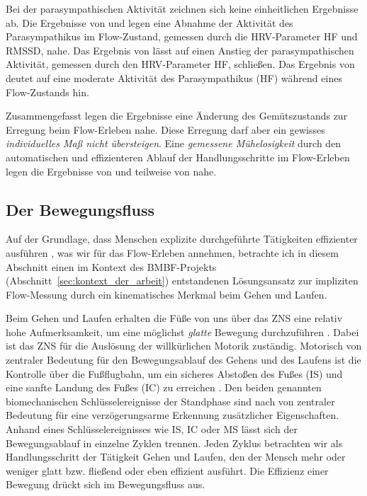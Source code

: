 Bei der parasympathischen Aktivität zeichnen sich keine einheitlichen Ergebnisse ab. Die Ergebnisse von \citet{deManzano2010} und \citet{Keller2011} legen eine Abnahme der Aktivität des Parasympathikus im Flow-Zustand, gemessen durch die \ac{HRV}-Parameter \acs{HF} und \acs{RMSSD}, nahe. Das Ergebnis von \citet{Peifer2014} lässt auf einen Anstieg der parasympathischen Aktivität, gemessen durch den \ac{HRV}-Parameter \acs{HF}, schließen. Das Ergebnis von \citet{Tozman2015} deutet auf eine moderate Aktivität des Parasympathikus (\acs{HF}) während eines Flow-Zustands hin.

Zusammengefasst legen die Ergebnisse eine Änderung des Gemütszustands zur Erregung beim Flow-Erleben nahe. Diese Erregung darf aber ein gewisses \emph{individuelles Maß nicht übersteigen}. Eine \emph{gemessene Mühelosigkeit} durch den automatischen und effizienteren Ablauf der Handlungsschritte im Flow-Erleben legen die Ergebnisse von \citet{Peifer2014} und teilweise von \citet{Tozman2015, Harmat2015} nahe.

\subsection{Der Bewegungsfluss} 

\label{ssub:der_bewegungsfluss}

Auf der Grundlage, dass Menschen explizite durchgeführte Tätigkeiten effizienter ausführen \citep[][S.~753]{Dietrich2004}, was wir für das Flow-Erleben annehmen, betrachte ich in diesem Abschnitt einen im Kontext des \acs{BMBF}-Projekts (Abschnitt~\ref{sec:kontext_der_arbeit}) entstandenen Lösungsansatz zur impliziten Flow-Messung durch ein kinematisches Merkmal beim Gehen und Laufen.

Beim Gehen und Laufen erhalten die Füße von uns über das \acs{ZNS} eine relativ hohe Aufmerksamkeit, um eine möglichst \emph{glatte} Bewegung durchzuführen \citep[][S.~193]{Brooks1986}. Dabei ist das \acs{ZNS} für die Auslösung der willkürlichen Motorik zuständig. Motorisch von zentraler Bedeutung für den Bewegungsablauf des Gehens und des Laufens ist die Kontrolle über die Fußflugbahn, um ein sicheres Abstoßen des Fußes (\ac{IS}) und eine sanfte Landung des Fußes (\ac{IC}) zu erreichen \citep[][S.~197]{Winter1989}. Den beiden genannten biomechanischen Schlüsselereignisse der Standphase sind nach \citet{Aminian2002, Lee2011} von zentraler Bedeutung für eine verzögerungsarme Erkennung zusätzlicher Eigenschaften. Anhand eines Schlüsselereignisses wie \ac{IS}, \ac{IC} oder \ac{MS} lässt sich der Bewegungsablauf in einzelne Zyklen trennen. Jeden Zyklus betrachten wir als Handlungsschritt der Tätigkeit Gehen und Laufen, den der Mensch mehr oder weniger glatt bzw. fließend oder eben effizient ausführt. Die Effizienz einer Bewegung drückt sich im Bewegungsfluss aus. 

